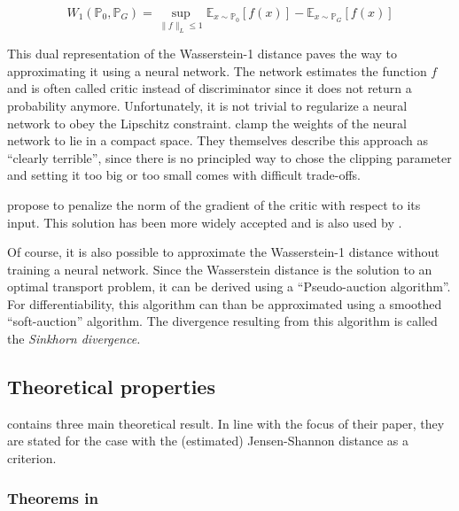\begin{theorem}
    \begin{equation}
        W_{1}\left(\mathbb{P}_0, \mathbb{P}_G\right)=\sup _{\|f\|_L \leq 1} \mathbb{E}_{x \sim \mathbb{P}_0}[f(x)]-\mathbb{E}_{x \sim \mathbb{P}_G}[f(x)]
    \end{equation}
\end{theorem}

This dual representation of the Wasserstein-1 distance paves the way to approximating it using a neural network.
The network estimates the function $f$ and is often called critic instead of discriminator since it does not return a probability anymore.
Unfortunately, it is not trivial to regularize a neural network to obey the Lipschitz constraint.
\Textcite{arjovsky2017wassersteingan} clamp the weights of the neural network to lie in a compact space.
They themselves describe this approach as ``clearly terrible'', since there is no principled way to chose the clipping parameter and setting it too big or too small comes with difficult trade-offs. %

\Textcite{gulrajani2017improvedtrainingwassersteingans} propose to penalize the norm of the gradient of the critic with respect to its input.
This solution has been more widely accepted and is also used by \textcite{athey2021using}.

Of course, it is also possible to approximate the Wasserstein-1 distance without training a neural network.
Since the Wasserstein distance is the solution to an optimal transport problem, it can be derived using a ``Pseudo-auction algorithm''.
For differentiability, this algorithm can than be approximated using a smoothed ``soft-auction'' algorithm.
The divergence resulting from this algorithm is called the \textit{Sinkhorn divergence.} %

\subsection{Theoretical properties}
\label{sec:theory}

\textcite{kaji2023adversarial} contains three main theoretical result.
In line with the focus of their paper, they are stated for the case with the (estimated) Jensen-Shannon distance as a criterion.

\subsubsection{Theorems in \cite{goodfellow2014generative}}



